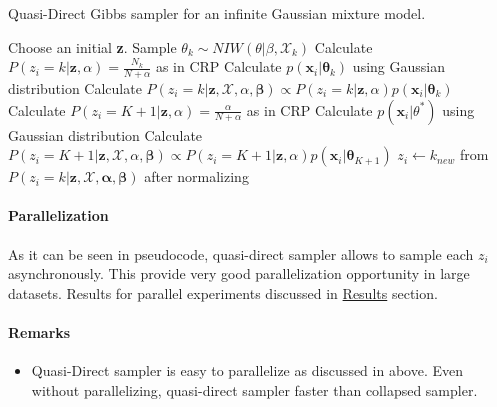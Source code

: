 \documentclass[a4paper]{article}
\begin{document}
\begin{algorithm}[H]
  \caption{Quasi-Direct Gibbs sampler for an infinite Gaussian mixture model.}\label{quasi-directgibbs}
  \begin{algorithmic}[1]
    
  \State Choose an initial \textbf{z}.
   
     
            \State Sample $\theta_k \sim NIW(\theta|\beta,\mathcal{X}_{k})$ 
    \EndFor
         
            \State Calculate $P(z_i = k | \mathbf{z},\alpha) = \frac{N_{k}}{N+\alpha}$ as in CRP
            \State Calculate $p(\mathbf{x}_i|\mathbf{\theta}_k)$ using Gaussian distribution
            \State Calculate $P(z_i = k | \mathbf{z},\mathcal{X},\alpha,\mathbf{\beta}) \propto P(z_i = k | \mathbf{z},\alpha)p(\mathbf{x}_i|\mathbf{\theta}_k)$
        \EndFor
        \State Calculate $P(z_i = K+1 | \mathbf{z},\alpha) = \frac{\alpha}{N+\alpha}$ as in CRP 
        \State Calculate $p(\mathbf{x}_i|\theta^*)$ using Gaussian distribution
        \State Calculate $P(z_i = K+1 | \mathbf{z},\mathcal{X},\alpha, \mathbf{\beta}) \propto P(z_i = K+1 | \mathbf{z},\alpha)p(\mathbf{x}_i|\mathbf{\theta}_{K+1})$
        \State $z_i \gets k_{new}$ from $P(z_i = k | \mathbf{z},\mathcal{X},\mathbf{\alpha},\mathbf{\beta})$ after normalizing
    \EndFor
  \EndFor
  \end{algorithmic}
\end{algorithm}



\paragraph{Parallelization}

As it can be seen in pseudocode, quasi-direct sampler allows to sample each
\(z_i\) asynchronously. This provide very good parallelization
opportunity in large datasets. Results for parallel experiments
discussed in \protect\hyperlink{ux20Results}{Results} section.


\paragraph{Remarks}

\begin{itemize}
\item
  Quasi-Direct sampler is easy to parallelize as discussed in above. Even
  without parallelizing, quasi-direct sampler faster than collapsed sampler.
\end{itemize}
\end{document}

